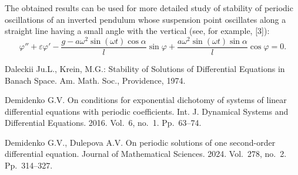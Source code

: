 \documentclass[12pt]{llncs}
\begin{document}
The obtained results can be used for more detailed study of stability of 
periodic oscillations of an inverted pendulum whose suspension point oscillates
along a straight line having a small angle with the vertical (see, for example, [3]): 
$$
\varphi'' + \varepsilon \varphi' - \frac{g - a \omega^2 \sin (\omega t) \cos \alpha}{l} \sin \varphi 
+ \frac{a \omega^2 \sin (\omega t) \sin \alpha}{l} \cos \varphi = 0.
$$		
	
\begin{thebibliography}{9} %

Daleckii Ju.L., Krein, M.G.:
Stability of Solutions of Differential Equations in Banach Space.
Am. Math. Soc., Providence, 1974.

Demidenko G.V. On conditions for exponential dichotomy 
of systems of linear differential equations with periodic coefficients.  
Int. J. Dynamical Systems and Differential Equations. 2016. Vol.~6, no.~1. Pp.~63--74.  

Demidenko G.V., Dulepova A.V. On periodic solutions of one second-order 
differential equation. Journal of Mathematical Sciences. %
2024. Vol.~278, 
no.~2. Pp.~314--327.

\end{thebibliography}

\end{document}
